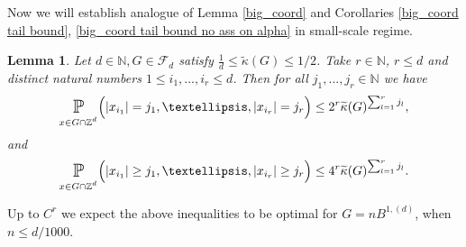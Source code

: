 \documentclass[10pt,a4paper]{amsart}
\numberwithin{equation}{section}
\newtheorem{Lem}[Thm]{Lemma}
\newcommand{\Pro}{\mathop{\mathbb{P}}}
\newcommand{\Z}{\mathbb{Z}}
\newcommand{\N}{\mathbb{N}}
\newcommand{\spr}[1]{\underset{_{\substack{#1}}}{\mathlarger{\mathlarger{\Pro}}}}
\begin{document}
Now we will establish analogue of Lemma \ref{big_coord} and Corollaries \ref{big_coord tail bound}, \ref{big_coord tail bound no ass on alpha} in small-scale regime.
\begin{Lem} \label{big_coord small scales}
    Let $d \in \N, G \in \mathcal{F}_d$ satisfy  $\frac{1}{d} \le \widetilde{\kappa}(G) \le 1/2 $. Take $r \in \N$, $r \le d$ and distinct natural numbers $1 \le i_1,...,i_r \le d$. Then for all $j_1,...,j_r \in \N$ we have
    \begin{equation} \label{eq:big cord small scale eq}
        \spr{x \in G \cap \Z^d} \Big( |x_{i_1}|=j_1, \ldots,|x_{i_r}|=j_r \Big) \le  2^r \widetilde{\kappa}(G)^{\sum_{l=1}^r j_l} ,
    \end{equation}
    and
    \begin{equation} \label{eq:big cord small scale geq}
       \spr{x \in G \cap \Z^d} \Big( |x_{i_1}| \ge j_1, \ldots,|x_{i_r}| \ge j_r \Big) \le  4^r \widetilde{\kappa}(G)^{\sum_{l=1}^r j_l} .
    \end{equation}
\end{Lem}
Up to $C^r$ we expect the above inequalities to be optimal for $G=nB^{1,(d)}$, when $n \le d/1000$.
\end{document}
